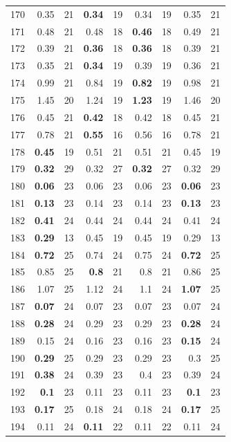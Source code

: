 \begin{longtable}{lr@{\hskip 4pt}l@{\hskip 12pt}r@{\hskip 4pt}l@{\hskip 12pt}r@{\hskip 4pt}l@{\hskip 12pt}r@{\hskip 4pt}l@{\hskip 12pt}}
170 & 0.35 & 21 & \textbf{0.34} & 19 & 0.34 & 19 & 0.35 & 21 \\
171 & 0.48 & 21 & 0.48 & 18 & \textbf{0.46} & 18 & 0.49 & 21 \\
172 & 0.39 & 21 & \textbf{0.36} & 18 & \textbf{0.36} & 18 & 0.39 & 21 \\
173 & 0.35 & 21 & \textbf{0.34} & 19 & 0.39 & 19 & 0.36 & 21 \\
174 & 0.99 & 21 & 0.84 & 19 & \textbf{0.82} & 19 & 0.98 & 21 \\
175 & 1.45 & 20 & 1.24 & 19 & \textbf{1.23} & 19 & 1.46 & 20 \\
176 & 0.45 & 21 & \textbf{0.42} & 18 & 0.42 & 18 & 0.45 & 21 \\
177 & 0.78 & 21 & \textbf{0.55} & 16 & 0.56 & 16 & 0.78 & 21 \\
178 & \textbf{0.45} & 19 & 0.51 & 21 & 0.51 & 21 & 0.45 & 19 \\
179 & \textbf{0.32} & 29 & 0.32 & 27 & \textbf{0.32} & 27 & 0.32 & 29 \\
180 & \textbf{0.06} & 23 & 0.06 & 23 & 0.06 & 23 & \textbf{0.06} & 23 \\
181 & \textbf{0.13} & 23 & 0.14 & 23 & 0.14 & 23 & \textbf{0.13} & 23 \\
182 & \textbf{0.41} & 24 & 0.44 & 24 & 0.44 & 24 & 0.41 & 24 \\
183 & \textbf{0.29} & 13 & 0.45 & 19 & 0.45 & 19 & 0.29 & 13 \\
184 & \textbf{0.72} & 25 & 0.74 & 24 & 0.75 & 24 & \textbf{0.72} & 25 \\
185 & 0.85 & 25 & \textbf{0.8} & 21 & 0.8 & 21 & 0.86 & 25 \\
186 & 1.07 & 25 & 1.12 & 24 & 1.1 & 24 & \textbf{1.07} & 25 \\
187 & \textbf{0.07} & 24 & 0.07 & 23 & 0.07 & 23 & 0.07 & 24 \\
188 & \textbf{0.28} & 24 & 0.29 & 23 & 0.29 & 23 & \textbf{0.28} & 24 \\
189 & 0.15 & 24 & 0.16 & 23 & 0.16 & 23 & \textbf{0.15} & 24 \\
190 & \textbf{0.29} & 25 & 0.29 & 23 & 0.29 & 23 & 0.3 & 25 \\
191 & \textbf{0.38} & 24 & 0.39 & 23 & 0.4 & 23 & 0.39 & 24 \\
192 & \textbf{0.1} & 23 & 0.11 & 23 & 0.11 & 23 & \textbf{0.1} & 23 \\
193 & \textbf{0.17} & 25 & 0.18 & 24 & 0.18 & 24 & \textbf{0.17} & 25 \\
194 & 0.11 & 24 & \textbf{0.11} & 22 & 0.11 & 22 & 0.11 & 24 \\

\end{longtable}
